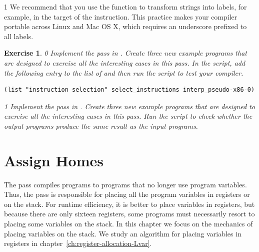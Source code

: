\documentclass[7x10]{TimesAPriori_MIT}%
\def\racketEd{0}
\def\pythonEd{1}
\def\edition{1}
\newcommand{\pythonColor}[0]{}
\newtheorem{exercise}[theorem]{Exercise}
\numberwithin{theorem}{chapter}
\numberwithin{definition}{chapter}
\numberwithin{equation}{chapter}
\begin{document}
{\if\edition\pythonEd\pythonColor
We recommend that you use the function  to
transform strings into labels, for example, in
the target of the  instruction. This practice makes your
compiler portable across Linux and Mac OS X, which requires an underscore
prefixed to all labels.
\fi}
\begin{exercise}
  \normalfont\normalsize
{\if\edition\racketEd
Implement the  pass in
. Create three new example programs that are
designed to exercise all the interesting cases in this pass.
%
In the  script, add the following entry to the
list of  and then run the script to test your compiler.
\begin{lstlisting}
(list "instruction selection" select_instructions interp_pseudo-x86-0)
\end{lstlisting}
\fi}
{\if\edition\pythonEd\pythonColor
Implement the  pass in
. Create three new example programs that are
designed to exercise all the interesting cases in this pass.
Run the  script to check
whether the output programs produce the same result as the input
programs.
\fi}
\end{exercise}


\section{Assign Homes}
\label{sec:assign-Lvar}

The  pass compiles \LangXVar{} programs to
\LangXVar{} programs that no longer use program variables.  Thus, the
 pass is responsible for placing all the program
variables in registers or on the stack. For runtime efficiency, it is
better to place variables in registers, but because there are only
sixteen registers, some programs must necessarily resort to placing
some variables on the stack. In this chapter we focus on the mechanics
of placing variables on the stack. We study an algorithm for placing
variables in registers in chapter~\ref{ch:register-allocation-Lvar}.
\end{document}
